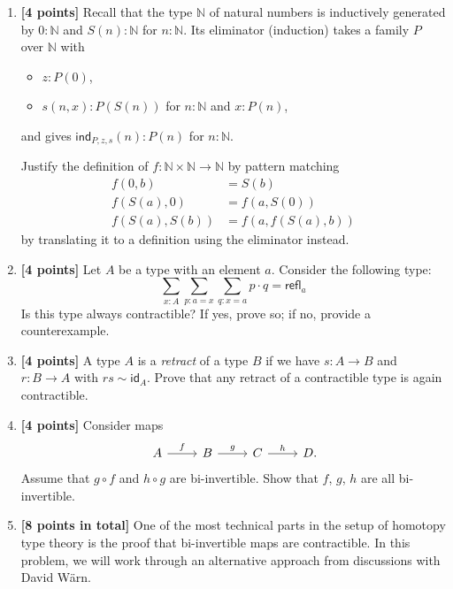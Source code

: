 \documentclass[11pt]{article}
\newcommand{\N}{\mathbb{N}}
\newcommand{\id}{\mathsf{id}}
\newcommand{\refl}{\mathsf{refl}}
\newcommand{\ind}{\mathsf{ind}}
\newcommand{\Nsucc}{S}
\begin{document}
\begin{enumerate}

\item \label{ackermann-pattern-matching}
\textbf{[4 points]}
Recall that the type $\N$ of natural numbers is inductively generated by $0 : \N$ and $S(n) : \N$ for $n : \N$.
Its eliminator (induction) takes a family $P$ over $\N$ with
\begin{itemize}
\item
$z : P(0)$,
\item
$s(n, x) : P(\Nsucc(n))$ for $n : \N$ and $x : P(n)$,
\end{itemize}
and gives $\ind_{P,z,s}(n) : P(n)$ for $n : \N$.

Justify the definition of $f : \N \times \N \to \N$ by pattern matching
\begin{align*}
f(0, b) &= \Nsucc(b)
\\
f(\Nsucc(a), 0) &= f(a, \Nsucc(0))
\\
f(\Nsucc(a), \Nsucc(b)) &= f(a, f(\Nsucc(a), b))
\end{align*}
by translating it to a definition using the eliminator instead.

\item \label{contractible-example}
\textbf{[4 points]}
Let $A$ be a type with an element $a$.
Consider the following type:
\[
\sum_{x : A} \sum_{p : a = x} \sum_{q : x = a} p \cdot q = \refl_a
\]
Is this type always contractible? If yes, prove so; if no, provide a counterexample.

\item \label{retract-contractible}
\textbf{[4 points]}
A type $A$ is a \emph{retract} of a type $B$ if we have $s : A \to B$ and $r : B \to A$ with $r s \sim \id_A$.
Prove that any retract of a contractible type is again contractible.

\item \label{2-out-of-6}
\textbf{[4 points]}
Consider maps
\[
\begin{tikzcd}
  A
  \ar{r}{f}
&
  B
  \ar{r}{g}
&
  C
  \ar{r}{h}
&
  D
\rlap{.}
\end{tikzcd}
\]
Assume that $g \circ f$ and $h \circ g$ are bi-invertible.
Show that $f$, $g$, $h$ are all bi-invertible.

\item \label{biinvertible-is-contractible}
\textbf{[8 points in total]}
One of the most technical parts in the setup of homotopy type theory is the proof that bi-invertible maps are contractible.
In this problem, we will work through an alternative approach from discussions with David Wärn.


\end{enumerate}
\end{document}

